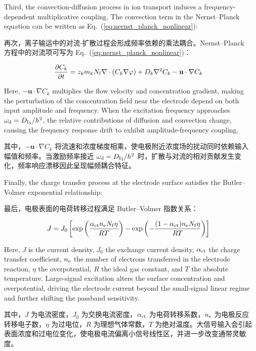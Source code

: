 \documentclass[sn-nature]{sn-jnl}
\newif\ifCNENEnglish
\newif\ifCNENBilingual
\newcommand{\CNEN}[2]{%
    \ifCNENBilingual
        #1%
        \if\relax\detokenize{#2}\relax\else\par #2\fi%
    \else
        \ifCNENEnglish
            #2%
        \else
            #1%
        \fi
    \fi
}
\begin{document}
\CNEN{再次，离子输运中的对流-扩散过程会形成频率依赖的乘法耦合。Nernst--Planck 方程中的对流项可写为 Eq.~(\ref{eq:nernst_planck_nonlinear})：}{Third, the convection-diffusion process in ion transport induces a frequency-dependent multiplicative coupling. The convection term in the Nernst--Planck equation can be written as Eq.~(\ref{eq:nernst_planck_nonlinear}):%
}
\begin{equation}
    \frac{\partial C_k}{\partial t} =
    z_k m_k N_{\rm f}\nabla\cdot(C_k\nabla\varphi)
    + D_k\nabla^2 C_k
    - \mathbf{u}\cdot\nabla C_k
    \label{eq:nernst_planck_nonlinear}
\end{equation}
\CNEN{其中，$-\mathbf{u}\cdot\nabla C_k$ 将流速和浓度梯度相乘，使电极附近浓度场的扰动同时依赖输入幅值和频率。当激励频率接近 $\omega_{\rm d}=D_{\mathrm{I}_3}/h^2$ 时，扩散与对流的相对贡献发生变化，频率响应漂移因此呈现幅频耦合特征。}{Here, $-\mathbf{u}\cdot\nabla C_k$ multiplies the flow velocity and concentration gradient, making the perturbation of the concentration field near the electrode depend on both input amplitude and frequency. When the excitation frequency approaches $\omega_{\rm d}=D_{\mathrm{I}_3}/h^2$, the relative contributions of diffusion and convection change, causing the frequency response drift to exhibit amplitude-frequency coupling.%
}

\CNEN{最后，电极表面的电荷转移过程满足 Butler--Volmer 指数关系：}{Finally, the charge transfer process at the electrode surface satisfies the Butler--Volmer exponential relationship:%
}
\begin{equation}
    J = J_0 \left[
    \exp\left(\frac{\alpha_{\rm ct} n_{\rm e} N_{\rm f} \eta}{RT}\right)
    -
    \exp\left(-\frac{(1-\alpha_{\rm ct}) n_{\rm e} N_{\rm f} \eta}{RT}\right)
    \right]
    \label{eq:butler_volmer_nonlinear}
\end{equation}
\CNEN{其中，$J$ 为电流密度，$J_0$ 为交换电流密度，$\alpha_{\rm ct}$ 为电荷转移系数，$n_{\rm e}$ 为电极反应转移电子数，$\eta$ 为过电位，$R$ 为理想气体常数，$T$ 为绝对温度。大信号输入会引起表面浓度和过电位变化，使电极电流偏离小信号线性区，并进一步改变通带灵敏度。}{Here, $J$ is the current density, $J_0$ the exchange current density, $\alpha_{\rm ct}$ the charge transfer coefficient, $n_{\rm e}$ the number of electrons transferred in the electrode reaction, $\eta$ the overpotential, $R$ the ideal gas constant, and $T$ the absolute temperature. Large-signal excitation alters the surface concentration and overpotential, driving the electrode current beyond the small-signal linear regime and further shifting the passband sensitivity.%
}
\end{document}
